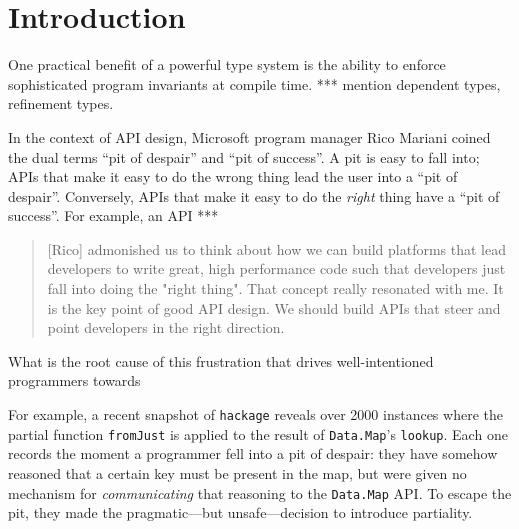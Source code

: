 \documentclass[format=sigplan, review=false, screen=true]{acmart}
\begin{document}
\renewcommand{\shortauthors}{M. Noonan}

%

\section{Introduction}

One practical benefit of a powerful type
system is the ability to enforce sophisticated program
invariants at compile time. *** mention dependent types,
refinement types.

In the context of API design, Microsoft program manager
Rico Mariani coined the dual terms ``pit of despair'' and
``pit of success''. A pit is easy to fall into; APIs that
make it easy to do the wrong thing lead the user into a ``pit of despair''.
Conversely, APIs that make it easy to do the \emph{right} thing
have a ``pit of success''. For example, an API ***

\begin{quote}
  [Rico] admonished us to think about how we can build platforms that lead developers to write great, high performance code such that developers just fall into doing the "right thing". That concept really resonated with me. It is the key point of good API design. We should build APIs that steer and point developers in the right direction.
\end{quote}

What is the root cause of this frustration that drives
well-intentioned programmers towards 


For example, a recent snapshot of \texttt{hackage}
reveals over 2000 instances where the partial function
\texttt{fromJust} is applied to the
result of \texttt{Data.Map}'s \texttt{lookup}. Each one
records the moment a programmer fell into a pit of despair:
they have somehow reasoned that a certain key must be
present in the map, but were given no mechanism for
\emph{communicating} that reasoning to the
\texttt{Data.Map} API. To escape the pit, they made the
pragmatic---but unsafe---decision to introduce partiality.
\end{document}
